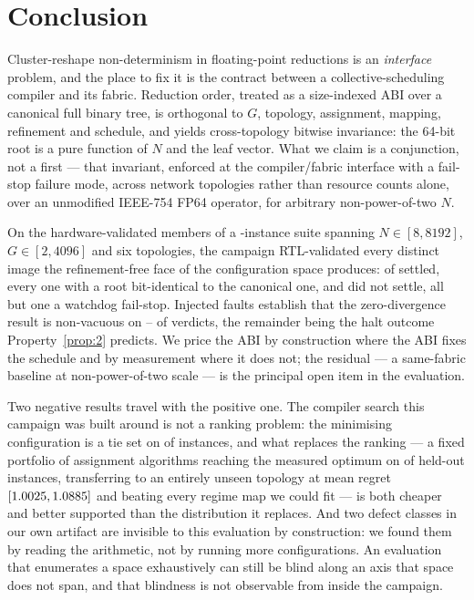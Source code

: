 \documentclass[journal,10pt]{IEEEtran}
\theoremstyle{plain}
\theoremstyle{definition}
\theoremstyle{remark}
\begin{document}
\section{Conclusion}\label{sec:conclusion}

Cluster-reshape non-determinism in floating-point reductions is an
\emph{interface} problem, and the place to fix it is the contract between a
collective-scheduling compiler and its fabric. Reduction order, treated as a
size-indexed ABI over a canonical full binary tree, is orthogonal to $G$,
topology, assignment, mapping, refinement and schedule, and yields
cross-topology bitwise invariance: the 64-bit root is a pure function of $N$
and the leaf vector. What we claim is a conjunction, not a first --- that
invariant, enforced at the compiler/fabric interface with a fail-stop failure
mode, across network topologies rather than resource counts alone, over an
unmodified IEEE-754 FP64 operator, for arbitrary non-power-of-two $N$.

On the \TournNInst{} hardware-validated members of a \SuiteSize{}-instance
suite spanning $N \in [8,8192]$, $G \in [2,4096]$ and six topologies, the
campaign RTL-validated every distinct image the refinement-free face of the
configuration space produces:
\WallTBs{} of \InvAttempted{} settled, every one with a root bit-identical to
the canonical one, and \InvNonSettling{} did not settle, all but one a watchdog
fail-stop. Injected faults establish that the zero-divergence result is
non-vacuous on \MutOracleLo{}--\MutOracleHi{} of \MutTotal{} verdicts, the
remainder being the halt outcome Property~\ref{prop:2} predicts. We price the
ABI by construction where the ABI fixes the schedule and by measurement where
it does not; the residual --- a same-fabric baseline at non-power-of-two scale
--- is the principal open item in the evaluation.

Two negative results travel with the positive one. The compiler search this
campaign was built around is not a ranking problem: the minimising
configuration is a tie set on \ClsTied{} of \TournNInst{} instances, and what
replaces the ranking --- a fixed portfolio of \SelConfigsRun{} assignment
algorithms reaching the measured optimum on \SelKFourOpt{} of \TournNInst{}
held-out instances, transferring to an entirely unseen topology at mean regret
\SelUnseenTopoMean{} $[1.0025, 1.0885]$ and beating every
regime map we could fit --- is both cheaper and better supported than the
distribution it replaces. And two defect classes in our own artifact are
invisible to this evaluation by construction: we found them by reading the
arithmetic, not by running more configurations. An evaluation that enumerates
a space exhaustively can still be blind along an axis that space does not
span, and that blindness is not observable from inside the campaign.
\end{document}
